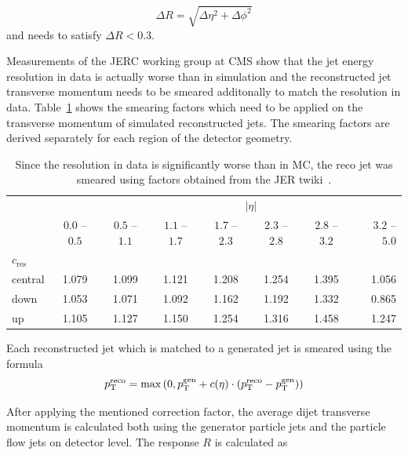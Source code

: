 \begin{equation}
\Delta R = \sqrt{\Delta \eta^2 + \Delta \phi^2}
\end{equation}
and needs to satisfy $\Delta R < 0.3$.

Measurements of the JERC working group at CMS show that the jet energy
resolution in data is actually worse than in simulation and the reconstructed
jet transverse momentum needs to be smeared additonally to match the resolution
in data. Table~\ref{tab:res_smearing} shows the smearing factors which need to
be applied on the transverse momentum of simulated reconstructed jets. The
smearing factors are derived separately for each region of the detector geometry.

\begin{table}[htbp]
\setlength\tabcolsep{4.5pt} 
    \centering
    \begin{tabular}{lccccccr}
    \toprule
    & & \multicolumn{6}{c}{$|\eta|$}\\\cmidrule{2-8}
               & $0.0$ -- $0.5$ & $0.5$ -- $1.1$ & $1.1$ -- $1.7$ & $1.7$ --
               $2.3$ & $2.3$ -- $2.8$ & $2.8$ -- $3.2$ & $3.2$ -- $5.0$\\
               $c_\text{res}$ &  &  &  & & & & \\\cmidrule{1-1}
    central    & 1.079                   & 1.099                   & 1.121    & 1.208                   & 1.254                   & 1.395    & 1.056\\
    down       & 1.053                   & 1.071                   & 1.092    & 1.162                   & 1.192                   & 1.332 & 0.865\\
    up         & 1.105                   & 1.127                   & 1.150 & 1.254                   & 1.316                   & 1.458 & 1.247\\
    \bottomrule
    \end{tabular}
    \caption{Since the resolution in data is significantly
             worse than in MC, the reco jet \pt was smeared using factors obtained from the
             JER twiki~\cite{JERC:Resolution}.}
    \label{tab:res_smearing}
\end{table}

Each reconstructed jet which is matched to a generated jet is smeared  using the formula
\begin{equation}
p_{\mathrm{T}}^{\text{reco}} = \max \left( 0, p_{\mathrm{T}}^{\text{gen}} + c(\eta) \cdot (p_{\mathrm{T}}^{\text{reco}} - p_{\mathrm{T}}^{\text{gen}}) \right)
\end{equation}

After applying the mentioned correction factor, the average dijet
transverse momentum is calculated both using the generator particle jets and
the particle flow jets on detector level. The response $R$ is calculated as

